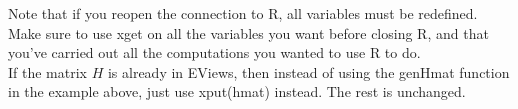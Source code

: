 \documentclass[12pt]{article}
\begin{document}
Note that if you reopen the connection to R, all variables must be redefined.  Make sure to use xget on all the variables you want before closing R, and that you've carried out all the computations you wanted to use R to do. \\

If the matrix $H$ is already in EViews, 
then instead of using the genHmat function in the example above, just use xput(hmat) instead.  The rest is unchanged.
\end{document}
